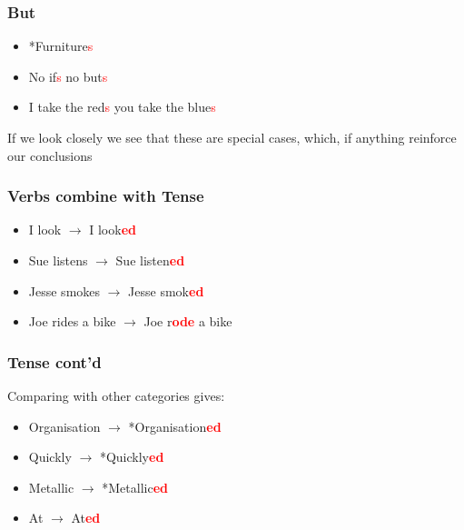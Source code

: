 \begin{frame}
\frametitle{But}

\begin{itemize}
\item *Furniture\textcolor{red}{s}
\item No if\textcolor{red}{s} no but\textcolor{red}{s}
\item I take the red\textcolor{red}{s} you take the blue\textcolor{red}{s}
\end{itemize}

  
If we look closely we see that these are special cases, which, if anything reinforce our conclusions


\end{frame}


\begin{frame}
 \frametitle{Verbs combine with Tense}

  \begin{itemize}
  \item I look $\rightarrow$ I look\textcolor{red}{\textbf{ed}}
  \item Sue listens $\rightarrow$ Sue listen\textcolor{red}{\textbf{ed}}
  \item Jesse smokes $\rightarrow$ Jesse smok\textcolor{red}{\textbf{ed}}
  \item Joe rides a bike $\rightarrow$ Joe r\textcolor{red}{\textbf{ode}} a bike
  \end{itemize}

\end{frame}

\begin{frame}
\frametitle{Tense cont'd}
  Comparing with other categories gives:


  \begin{itemize}
  \item Organisation $\rightarrow$ *Organisation\textcolor{red}{\textbf{ed}}
  \item Quickly $\rightarrow$ *Quickly\textcolor{red}{\textbf{ed}}
  \item Metallic $\rightarrow$ *Metallic\textcolor{red}{\textbf{ed}}
  \item At $\rightarrow$ At\textcolor{red}{\textbf{ed}}
  \end{itemize}

\end{frame}


